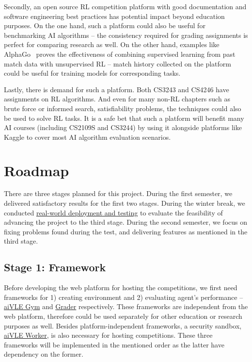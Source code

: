 Secondly, an open source RL competition platform with good documentation and software engineering best practices has potential impact beyond education purposes. On the one hand, such a platform could also be useful for benchmarking AI algorithms – the consistency required for grading assignments is perfect for comparing research as well. On the other hand, examples like AlphaGo~\cite{alphago} proves the effectiveness of combining supervised learning from past match data with unsupervised RL – match history collected on the platform could be useful for training models for corresponding tasks. 

Lastly, there is demand for such a platform. Both CS3243 and CS4246 have assignments on RL algorithms. And even for many non-RL chapters such as brute force or informed search, satisfiability problems, the techniques could also be used to solve RL tasks. It is a safe bet that such a platform will benefit many AI courses (including CS2109S and CS3244) by using it alongside platforms like Kaggle to cover most AI algorithm evaluation scenarios.

\section{Roadmap}
\label{s:project-objective-roadmap}
There are three stages planned for this project. During the first semester, we delivered satisfactory results for the first two stages. During the winter break, we conducted \hyperref[ch:deployment-and-testing]{real-world deployment and testing} to evaluate the feasibility of advancing the project to the third stage. During the second semester, we focus on fixing problems found during the test, and delivering features as mentioned in the third stage.

\subsection{Stage 1: Framework}
Before developing the web platform for hosting the competitions, we first need frameworks for 1) creating environment and 2) evaluating agent’s performance – \hyperref[ch:aivle-gym]{aiVLE Gym} and \hyperref[ch:aivle-grader]{Grader} respectively. These frameworks are independent from the web platform, therefore could be used separately for other education or research purposes as well.
Besides platform-independent frameworks, a security sandbox, \hyperref[ch:aivle-worker]{aiVLE Worker}, is also necessary for hosting competitions. These three frameworks will be implemented in the mentioned order as the latter have dependency on the former.

